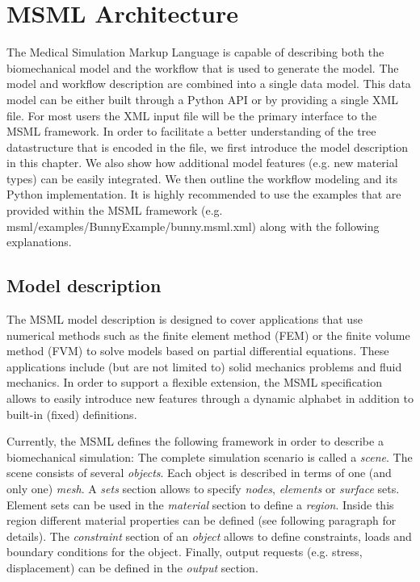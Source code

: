 \section{MSML Architecture}
\label{sec:msml-architecture}

The Medical Simulation Markup Language is capable of describing both the biomechanical model and the workflow that is used to generate the model. The model and workflow description are combined into a single data model. This data model can be either built through a Python API or by providing a single XML file. For most users the XML input file will be the primary interface to the MSML framework. In order to facilitate a better understanding of the tree datastructure that is encoded in the file, we first introduce the model description in this chapter. We also show how additional model features (e.g. new material types) can be easily integrated. We then outline the workflow modeling and its Python implementation. It is highly recommended to use the examples that are provided within the MSML framework (e.g. msml/examples/BunnyExample/bunny.msml.xml) along with the following explanations.

\subsection{Model description}

The MSML model description is designed to cover applications that use numerical methods such as the finite element method (FEM) or the finite volume method (FVM) to solve models based on partial differential equations. These applications include (but are not limited to) solid mechanics problems and fluid mechanics. In order to support a flexible extension, the MSML specification allows to easily introduce new features through a dynamic alphabet in addition to built-in (fixed) definitions.

Currently, the MSML defines the following framework in order to describe a biomechanical simulation: The complete simulation scenario is called a \emph{scene}. The scene consists of several \emph{objects}. Each object is described in terms of one (and only one) \emph{mesh}. A \emph{sets} section allows to specify \emph{nodes}, \emph{elements} or \emph{surface} sets. Element sets can be used in the \emph{material} section to define a \emph{region}. Inside this region different material properties can be defined (see following paragraph for details). The \emph{constraint} section of an \emph{object} allows to define constraints, loads and boundary conditions for the object. Finally, output requests (e.g. stress, displacement) can be defined in the \emph{output} section.

